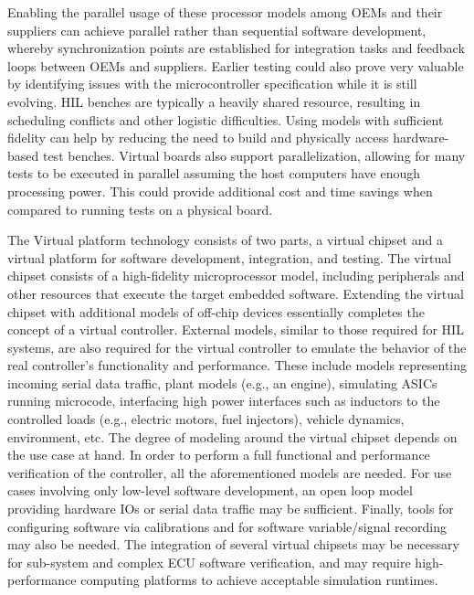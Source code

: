 Enabling the parallel usage of these processor models among OEMs and their suppliers can achieve parallel rather than sequential software development, whereby synchronization points are established for integration tasks and feedback loops between OEMs and suppliers.
Earlier testing could also prove very valuable by identifying issues with the microcontroller specification while it is still evolving.
% 
HIL benches are typically a heavily shared resource, resulting in scheduling conflicts and other logistic difficulties.
Using models with sufficient fidelity can help by reducing the need to build and physically access hardware-based test benches.
Virtual boards also support parallelization, allowing for many tests to be executed in parallel assuming the host computers have enough processing power.
This could provide additional cost and time savings when compared to running tests on a physical board.

The Virtual platform technology consists of two parts, a virtual chipset and a virtual platform for software development, integration, and testing.
The virtual chipset consists of a high-fidelity microprocessor model, including peripherals and other resources that execute the target embedded software.
Extending the virtual chipset with additional models of off-chip devices essentially completes the concept of a virtual controller.
External models, similar to those required for HIL systems, are also required for the virtual controller to emulate the behavior of the real controller's functionality and performance.
These include models representing incoming serial data traffic, plant models (e.g., an engine), simulating ASICs running microcode, interfacing high power interfaces such as inductors to the controlled loads (e.g., electric motors, fuel injectors), vehicle dynamics, environment, etc.
The degree of modeling around the virtual chipset depends on the use case at hand.
In order to perform a full functional and performance verification of the controller, all the aforementioned models are needed.
For use cases involving only low-level software development, an open loop model providing hardware IOs or serial data traffic may be sufficient.
Finally, tools for configuring software via calibrations and for software variable/signal recording may also be needed.
The integration of several virtual chipsets may be necessary for sub-system and complex ECU software verification, and may require high-performance computing platforms to achieve acceptable simulation runtimes.

